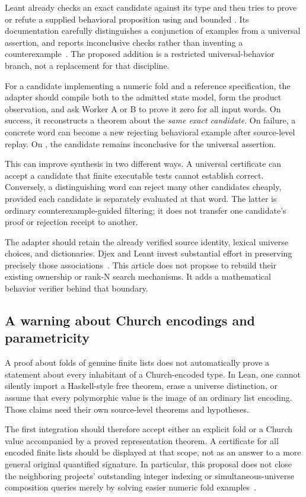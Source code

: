 Leant already checks an exact candidate against its type and then tries to
prove or refute a supplied behavioral proposition using  and
bounded . Its documentation carefully distinguishes a conjunction
of examples from a universal assertion, and reports inconclusive checks rather
than inventing a counterexample~\cite{leant-behavior}. The proposed addition is
a restricted universal-behavior branch, not a replacement for that discipline.

For a candidate implementing a numeric fold and a reference specification, the
adapter should compile both to the admitted state model, form the product
observation, and ask Worker A or B to prove it zero for all input words. On
success, it reconstructs a theorem about the \emph{same exact candidate}. On
failure, a concrete word can become a new rejecting behavioral example after
source-level replay. On \Unknown, the candidate remains inconclusive for the
universal assertion.

This can improve synthesis in two different ways. A universal certificate can
accept a candidate that finite executable tests cannot establish correct.
Conversely, a distinguishing word can reject many other candidates cheaply,
provided each candidate is separately evaluated at that word. The latter is
ordinary counterexample-guided filtering; it does not transfer one candidate's
proof or rejection receipt to another.

The adapter should retain the already verified source identity, lexical
universe choices, and dictionaries. Djex and Leant invest substantial effort in
preserving precisely those associations~\cite{djex,leant}. This article does not
propose to rebuild their existing ownership or rank-N search mechanisms. It
adds a mathematical behavior verifier behind that boundary.

\subsection{A warning about Church encodings and parametricity}

A proof about folds of genuine finite lists does not automatically prove a
statement about every inhabitant of a Church-encoded type. In Lean, one cannot
silently import a Haskell-style free theorem, erase a universe distinction, or
assume that every polymorphic value is the image of an ordinary list encoding.
Those claims need their own source-level theorems and hypotheses.

The first integration should therefore accept either an explicit 
fold or a Church value accompanied by a proved representation theorem. A
certificate for all encoded finite lists should be displayed at that scope,
not as an answer to a more general original quantified signature. In particular,
this proposal does not close the neighboring projects' outstanding integer
indexing or simultaneous-universe composition queries merely by solving easier
numeric fold examples~\cite{leant,djex}.

